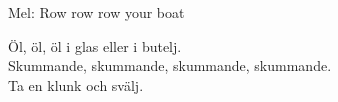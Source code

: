 \begin{SongText}[Öl, öl, öl i glas]
    \begin{SongInfo}
        Mel: Row row row your boat
    \end{SongInfo}
    \begin{SongVerse}
        Öl, öl, öl i glas eller i butelj.\\%
        Skummande, skummande, skummande, skummande.\\%
        Ta en klunk och svälj.
    \end{SongVerse}
\end{SongText}
